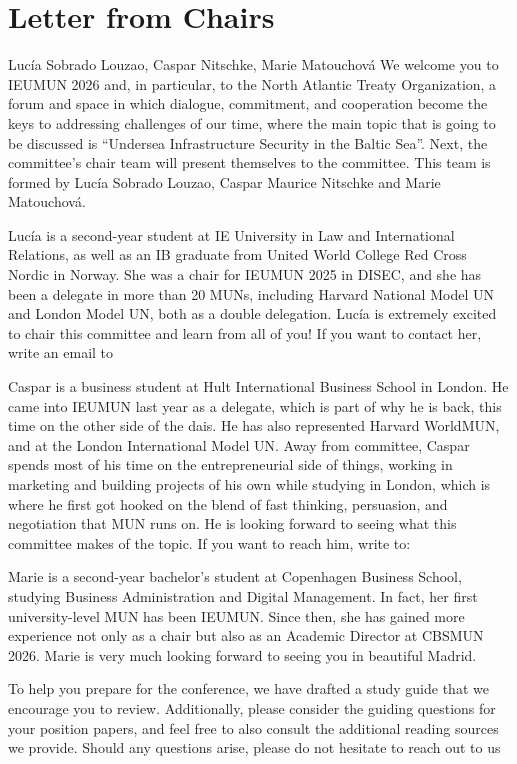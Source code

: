 \section{Letter from Chairs}

\begin{chairletter}{Lucía Sobrado Louzao, Caspar Nitschke, Marie Matouchová}
We welcome you to IEUMUN 2026 and, in particular, to the North Atlantic Treaty Organization, a forum and space in which dialogue, commitment, and cooperation become the keys to addressing challenges of our time, where the main topic that is going to be discussed is “Undersea Infrastructure Security in the Baltic Sea”. Next, the committee's chair team will present themselves to the committee. This team is formed by Lucía Sobrado Louzao, Caspar Maurice Nitschke and Marie Matouchová.

Lucía is a second-year student at IE University in Law and International Relations, as well as an IB graduate from United World College Red Cross Nordic in Norway. She was a chair for IEUMUN 2025 in DISEC, and she has been a delegate in more than 20 MUNs, including Harvard National Model UN and London Model UN, both as a double delegation. Lucía is extremely excited to chair this committee and learn from all of you! If you want to contact her, write an email to 

Caspar is a business student at Hult International Business School in London. He came into IEUMUN last year as a delegate, which is part of why he is back, this time on the other side of the dais. He has also represented Harvard WorldMUN, and at the London International Model UN. Away from committee, Caspar spends most of his time on the entrepreneurial side of things, working in marketing and building projects of his own while studying in London, which is where he first got hooked on the blend of fast thinking, persuasion, and negotiation that MUN runs on. He is looking forward to seeing what this committee makes of the topic. If you want to reach him, write to: 

Marie is a second-year bachelor’s student at Copenhagen Business School, studying Business Administration and Digital Management. In fact, her first university-level MUN has been IEUMUN. Since then, she has gained more experience not only as a chair but also as an Academic Director at CBSMUN 2026. Marie is very much looking forward to seeing you in beautiful Madrid.

To help you prepare for the conference, we have drafted a study guide that we encourage you to review. Additionally, please consider the guiding questions for your position papers, and feel free to also consult the additional reading sources we provide. Should any questions arise, please do not hesitate to reach out to us

\end{chairletter}
